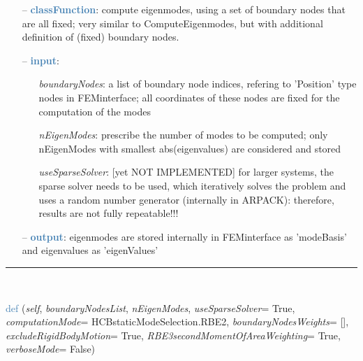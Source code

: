 \begin{itemize}[leftmargin=1.4cm]
\begin{itemize}[leftmargin=1.4cm]
\begin{itemize}[leftmargin=0.5cm]
\begin{itemize}[leftmargin=1.4cm]
\begin{itemize}[leftmargin=1.4cm]
\begin{itemize}[leftmargin=0.5cm]
\begin{flushleft}
\end{flushleft}
\setlength{\itemindent}{0.7cm}
\begin{itemize}[leftmargin=0.7cm]
  \item[--]  \textcolor{steelblue}{\bf classFunction}: compute eigenmodes, using a set of boundary nodes that are all fixed; very similar to ComputeEigenmodes, but with additional definition of (fixed) boundary nodes.  \item[--]  \textcolor{steelblue}{\bf input}: \vspace{-6pt}
  \begin{itemize}[leftmargin=1.2cm]
\setlength{\itemindent}{-0.7cm}
    \item[] {\it boundaryNodes}: a list of boundary node indices, refering to 'Position' type nodes in FEMinterface; all coordinates of these nodes are fixed for the computation of the modes
    \item[] {\it   nEigenModes}: prescribe the number of modes to be computed; only nEigenModes with smallest abs(eigenvalues) are considered and stored
    \item[] {\it   useSparseSolver}: [yet NOT IMPLEMENTED] for larger systems, the sparse solver needs to be used, which iteratively solves the problem and uses a random number generator (internally in ARPACK): therefore, results are not fully repeatable!!!
  \end{itemize}
  \item[--]  \textcolor{steelblue}{\bf output}: eigenmodes are stored internally in FEMinterface as 'modeBasis' and eigenvalues as 'eigenValues'\vspace{12pt}\end{itemize}
%
\noindent\rule{8cm}{0.75pt}\vspace{1pt} \\ 
\begin{flushleft}
\noindent \textcolor{steelblue}{def {\bf {}}}\label{sec:FEM:FEMinterface:ComputeHurtyCraigBamptonModes}
({\it self}, {\it boundaryNodesList}, {\it nEigenModes}, {\it useSparseSolver}= True, {\it computationMode}= HCBstaticModeSelection.RBE2, {\it boundaryNodesWeights}= [], {\it excludeRigidBodyMotion}= True, {\it RBE3secondMomentOfAreaWeighting}= True, {\it verboseMode}= False)
\end{flushleft}
\setlength{\itemindent}{0.7cm}
\begin{itemize}[leftmargin=0.7cm]

\end{itemize}
\end{itemize}
\end{itemize}
\end{itemize}
\end{itemize}
\end{itemize}
\end{itemize}
